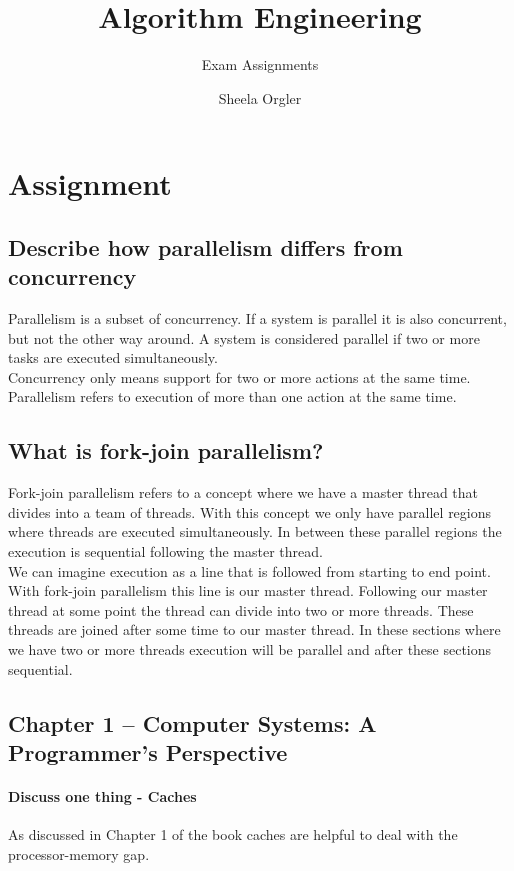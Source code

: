\documentclass[runningheads]{llncs}
\begin{document}
\title{Algorithm Engineering}
\subtitle{Exam Assignments}


\author{Sheela Orgler}

\maketitle


\section{Assignment}

\subsection{Describe how parallelism differs from concurrency}
Parallelism is a subset of concurrency. If a system is parallel it is also concurrent, but not the other way around. 
A system is considered parallel if two or more tasks are executed simultaneously.
\\
Concurrency only means support for two or more actions at the same time. 
Parallelism refers to execution of more than one action at the same time.

\subsection{What is fork-join parallelism?}
Fork-join parallelism refers to a concept where we have a master thread that divides into a team of threads. 
With this concept we only have parallel regions where threads are executed simultaneously. 
In between these parallel regions the execution is sequential following the master thread. 
\\
We can imagine execution as a line that is followed from starting to end point. 
With fork-join parallelism this line is our master thread. 
Following our master thread at some point the thread can divide into two or more threads. 
These threads are joined after some time to our master thread. 
In these sections where we have two or more threads execution will be parallel and after these sections sequential. 


\subsection {Chapter 1 – Computer Systems: A Programmer’s Perspective}

\paragraph{Discuss one thing - Caches}
As discussed in Chapter 1 of the book caches are helpful to deal with the processor-memory gap. 
\end{document}
